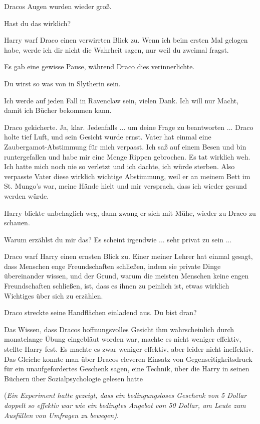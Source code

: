 Dracos Augen wurden wieder groß.

\glqq Hast du das wirklich?\grqq{}

Harry warf Draco einen verwirrten Blick zu. \glqq Wenn ich beim ersten Mal
gelogen habe, werde ich dir nicht die Wahrheit sagen, nur weil du zweimal
fragst.\grqq{}

Es gab eine gewisse Pause, während Draco dies verinnerlichte.

\glqq Du wirst so was von in Slytherin sein.\grqq{}

\glqq Ich werde auf jeden Fall in Ravenclaw sein, vielen Dank. Ich will nur
Macht, damit ich Bücher bekommen kann.\grqq{}

Draco gekicherte. \glqq Ja, klar. Jedenfalls ... um deine Frage zu beantworten
...\grqq{} Draco holte tief Luft, und sein Gesicht wurde ernst. \glqq Vater hat
einmal eine Zaubergamot-Abstimmung für mich verpasst. Ich saß auf einem Besen
und bin runtergefallen und habe mir eine Menge Rippen gebrochen. Es tat wirklich
weh. Ich hatte mich noch nie so verletzt und ich dachte, ich würde sterben. Also
verpasste Vater diese wirklich wichtige Abstimmung, weil er an meinem Bett im
St. Mungo's war, meine Hände hielt und mir versprach, dass ich wieder gesund
werden würde.\grqq{}

Harry blickte unbehaglich weg, dann zwang er sich mit Mühe, wieder zu Draco zu
schauen.

\glqq Warum erzählst du mir das? Es scheint irgendwie ... sehr privat zu sein
...\grqq{}

Draco warf Harry einen ernsten Blick zu. \glqq Einer meiner Lehrer hat einmal
gesagt, dass Menschen enge Freundschaften schließen, indem sie private Dinge
übereinander wissen, und der Grund, warum die meisten Menschen keine engen
Freundschaften schließen, ist, dass es ihnen zu peinlich ist, etwas wirklich
Wichtiges über sich zu erzählen.\grqq{}

Draco streckte seine Handflächen einladend aus. \glqq Du bist dran?\grqq{}

Das Wissen, dass Dracos hoffnungsvolles Gesicht ihm wahrscheinlich durch
monatelange Übung eingebläut worden war, machte es nicht weniger effektiv,
stellte Harry fest. Es machte es zwar weniger effektiv, aber leider nicht
ineffektiv. Das Gleiche konnte man über Dracos cleveren Einsatz von
Gegenseitigkeitsdruck für ein unaufgefordertes Geschenk sagen, eine Technik,
über die Harry in seinen Büchern über Sozialpsychologie gelesen hatte

(\emph{Ein Experiment hatte gezeigt, dass ein bedingungsloses Geschenk von 5
Dollar doppelt so effektiv war wie ein bedingtes Angebot von 50 Dollar, um Leute
zum Ausfüllen von Umfragen zu bewegen)}.

